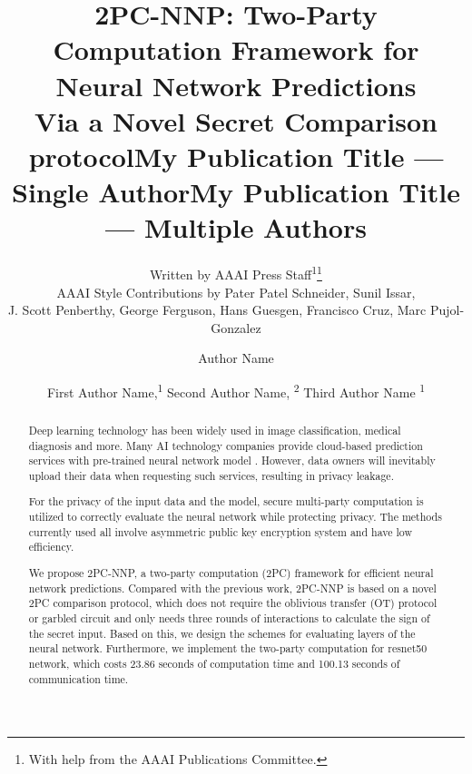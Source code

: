 \documentclass[letterpaper]{article} %
\title{2PC-NNP: Two-Party Computation Framework for Neural Network Predictions \\ Via a Novel Secret Comparison protocol}
\author{
    Written by AAAI Press Staff\textsuperscript{\rm 1}\thanks{With help from the AAAI Publications Committee.}\\
    AAAI Style Contributions by Pater Patel Schneider,
    Sunil Issar,\\
    J. Scott Penberthy,
    George Ferguson,
    Hans Guesgen,
    Francisco Cruz\equalcontrib,
    Marc Pujol-Gonzalez\equalcontrib
}
\title{My Publication Title --- Single Author}
\author {
    Author Name
}
\title{My Publication Title --- Multiple Authors}
\author {
    First Author Name,\textsuperscript{\rm 1}
    Second Author Name, \textsuperscript{\rm 2}
    Third Author Name \textsuperscript{\rm 1}
}
\begin{document}
\maketitle

\begin{abstract}

    Deep learning technology has been widely used in image classification, medical diagnosis and more. 
    Many AI technology companies provide cloud-based prediction services with pre-trained neural network model . 
    However, data owners will inevitably upload their data  
    when requesting such services, resulting in privacy leakage.


    For the privacy of the input data and the model, 
    secure multi-party computation is utilized
    to correctly evaluate the neural network while protecting privacy. 
    The methods currently used all involve asymmetric public key encryption system and have low efficiency.

    We propose 2PC-NNP, a two-party computation (2PC) framework for efficient neural network predictions.%
    Compared with the previous work, 2PC-NNP is based on a novel 2PC comparison protocol, 
    which does not require the oblivious transfer (OT) protocol or garbled circuit 
    and only needs three rounds of interactions to calculate the sign of the secret input. 
    Based on this, we design the schemes for evaluating layers of the neural network. 
    Furthermore, we implement the two-party computation for resnet50 network, 
    which costs 23.86 seconds of computation time and 100.13 seconds of communication time.
    
    


\end{abstract}
    
\end{document}
